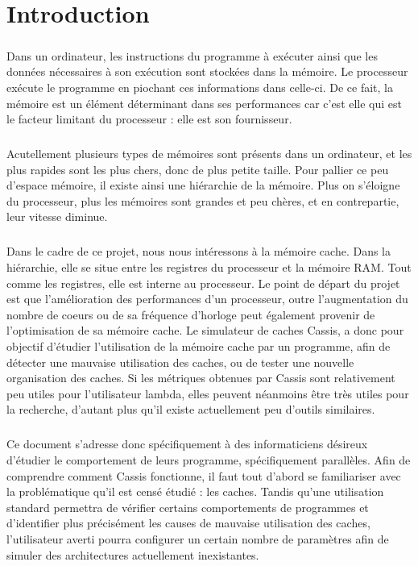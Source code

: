 \chapter*{Introduction}

\paragraph{}
Dans un ordinateur, les instructions du programme à exécuter ainsi que les données nécessaires
à son exécution sont stockées dans la mémoire. Le processeur exécute le programme en piochant ces informations dans celle-ci. De ce fait, la mémoire est un élément déterminant dans ses performances car c'est elle qui est le facteur limitant du processeur : elle est son fournisseur.

\paragraph{}
Acutellement plusieurs types de mémoires sont présents dans un ordinateur, et les plus rapides sont les plus chers, donc de plus petite taille.
Pour pallier ce peu d'espace mémoire, il existe ainsi une hiérarchie de la mémoire. Plus on s'éloigne du processeur, plus les mémoires sont grandes et peu chères, et en contrepartie, leur vitesse diminue. 

\paragraph{}
Dans le cadre de ce projet, nous nous intéressons à la mémoire cache. Dans la hiérarchie, elle se situe entre les registres du processeur et la mémoire RAM. Tout comme les registres, elle est interne au processeur.
Le point de départ du projet est que l'amélioration des performances d'un processeur, outre l'augmentation du nombre de coeurs ou de sa fréquence d'horloge peut également provenir de l'optimisation de sa mémoire cache. Le simulateur de caches \textsf{Cassis}, a donc pour objectif d'étudier l'utilisation de la mémoire cache par un programme, afin de détecter une mauvaise utilisation des caches, ou de tester une nouvelle organisation des caches. Si les métriques obtenues par \textsf{Cassis} sont relativement peu utiles pour l'utilisateur lambda, elles peuvent néanmoins être très utiles pour la recherche, d'autant plus qu'il existe actuellement peu d'outils similaires.

\paragraph{}
Ce document s'adresse donc spécifiquement à des informaticiens désireux d'étudier le comportement de leurs programme, spécifiquement parallèles. Afin de comprendre comment \textsf{Cassis} fonctionne, il faut tout d'abord se familiariser avec la problématique qu'il est censé étudié : les caches. Tandis qu'une utilisation standard permettra de vérifier certains comportements de programmes et d'identifier plus précisément les causes de mauvaise utilisation des caches, l'utilisateur averti pourra configurer un certain nombre de paramètres afin de simuler des architectures actuellement inexistantes.
